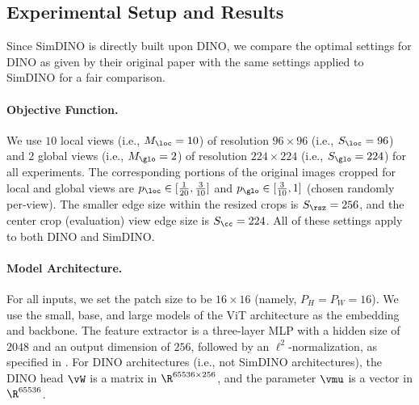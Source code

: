 \documentclass[../../book-main.tex]{subfiles}
\begin{document}
\subsection{Experimental Setup and Results}
\label{sub:contrastive_learning_experiment_results}

Since SimDINO is directly built upon DINO, we compare the optimal
settings for DINO as given by their original paper
\citep{caron2021emerging} with the same settings applied to SimDINO \citep{wu2025simplifying}
for a fair comparison.

\paragraph{Objective Function.} We use \(10\) local views (i.e.,
\(M_{\loc} = 10\)) of resolution \(96 \times 96\) (i.e., \(S_{\loc} =
96\)) and \(2\) global views (i.e., \(M_{\glo} = 2\)) of resolution
\(224 \times 224\) (i.e., \(S_{\glo} = 224\)) for all experiments.
The corresponding portions of the original images cropped for local
and global views are \(p_{\loc} \in [\frac{1}{20}, \frac{3}{10}]\)
and \(p_{\glo} \in [\frac{3}{10}, 1]\) (chosen randomly per-view).
The smaller edge size within the resized crops is \(S_{\rsz} = 256\),
and the center crop (evaluation) view edge size is \(S_{\cc} = 224\).
All of these settings apply to both DINO and SimDINO.

\paragraph{Model Architecture.} For all inputs, we set the patch size
to be \(16 \times 16\) (namely, \(P_{H} = P_{W} = 16\)).
We use the
small, base, and large models of the ViT \citep{dosovitskiy2020image}
architecture as the embedding and backbone.
The feature extractor is
a three-layer MLP with a hidden size of \(2048\) and an output
dimension of \(256\), followed by an \(\ell^{2}\)-normalization, as
specified in .
For DINO
architectures (i.e., not SimDINO architectures), the DINO head
\(\vW\) is a matrix in \(\R^{65536 \times 256}\), and the parameter
\(\vmu\) is a vector in \(\R^{65536}\).
\end{document}
